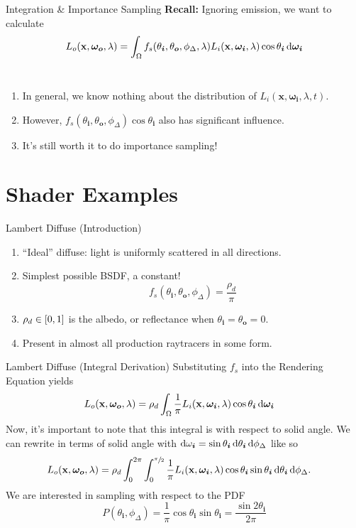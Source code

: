 \documentclass[10pt]{beamer}
\begin{document}
\begin{frame}{Integration \& Importance Sampling}
  \textbf{Recall:} Ignoring emission, we want to calculate
  \[L_{o}(\mathbf x, \bm {\omega_{o}}, \lambda) = \int_\Omega f_s(\theta_{\bm i}, \theta_{\bm o}, \phi_\Delta, \lambda)L_i(\mathbf x, \bm{\omega_i}, \lambda)\cos \theta_{\bm i} \dif \bm{\omega_i}\]
  \\[-0.5em]
  \begin{enumerate}
  \item In general, we know nothing about the distribution of \(L_i(\mathbf x, \bm{\omega_i}, \lambda, t)\).
  \item However, \(f_s(\theta_{\bm i}, \theta_{\bm o}, \phi_\Delta)\cos \theta_{\bm i}\) also has significant influence.
  \item It's still worth it to do importance sampling!
  \end{enumerate}
\end{frame}

\section{Shader Examples}

\begin{frame}{Lambert Diffuse (Introduction)}
  \begin{enumerate}
  \item ``Ideal'' diffuse: light is uniformly scattered in all directions.
  \item Simplest possible BSDF, a constant!
    \[f_s(\theta_{\bm i}, \theta_{\bm o}, \phi_\Delta) = \frac{\rho_d}{\pi}\]
  \item \(\rho_d \in \intcc{0,1}\) is the albedo, or reflectance when \( \theta_{\bm i} = \theta_{\bm o} = 0\).
  \item Present in almost all production raytracers in some form.
  \end{enumerate}
\end{frame}

\begin{frame}{Lambert Diffuse (Integral Derivation)}
  Substituting \(f_s\) into the Rendering Equation yields
  \begin{align*}
    L_{o}(\mathbf x, \bm {\omega_{o}}, \lambda)
    &= \rho_d \int_\Omega \frac{1}{\pi} L_i(\mathbf x, \bm{\omega_i}, \lambda)\cos\theta_{\bm i} \dif \bm{\omega_i}
  \end{align*}
  Now, it's important to note that this integral is with respect to solid angle.
  We can rewrite in terms of solid angle with \( \dif \omega_{\bm i} = \sin\theta_{\bm i} \dif\theta_{\bm i}\dif\phi_\Delta\) like so
  \begin{align*}
   L_{o}(\mathbf x, \bm {\omega_{o}}, \lambda) &= \rho_d \int_0^{2\pi}\int_0^{\sfrac{\pi}{2}} \frac{1}{\pi} L_i(\mathbf x, \bm{\omega_i}, \lambda)\cos\theta_{\bm i} \sin\theta_{\bm i}\dif \theta_{\bm i} \dif \phi_\Delta.
  \end{align*}
  We are interested in sampling with respect to the PDF
  \[P(\theta_{\bm i}, \phi_\Delta) = \frac{1}{\pi}\cos \theta_{\bm i}\sin \theta_{\bm i} = \frac{\sin 2\theta_{\bm i}}{2\pi}\]
\end{frame}
\end{document}
